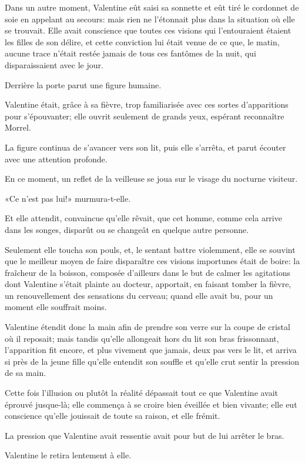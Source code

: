 Dans un autre moment, Valentine eût saisi sa sonnette et eût tiré le cordonnet de soie en appelant au secours: mais rien ne l'étonnait plus dans la situation où elle se trouvait. Elle avait conscience que toutes ces visions qui l'entouraient étaient les filles de son délire, et cette conviction lui était venue de ce que, le matin, aucune trace n'était restée jamais de tous ces fantômes de la nuit, qui disparaissaient avec le jour. 

Derrière la porte parut une figure humaine. 

Valentine était, grâce à sa fièvre, trop familiarisée avec ces sortes d'apparitions pour s'épouvanter; elle ouvrit seulement de grands yeux, espérant reconnaître Morrel. 

La figure continua de s'avancer vers son lit, puis elle s'arrêta, et parut écouter avec une attention profonde. 

En ce moment, un reflet de la veilleuse se joua sur le visage du nocturne visiteur. 

«Ce n'est pas lui!» murmura-t-elle. 

Et elle attendit, convaincue qu'elle rêvait, que cet homme, comme cela arrive dans les songes, disparût ou se changeât en quelque autre personne. 

Seulement elle toucha son pouls, et, le sentant battre violemment, elle se souvint que le meilleur moyen de faire disparaître ces visions importunes était de boire: la fraîcheur de la boisson, composée d'ailleurs dans le but de calmer les agitations dont Valentine s'était plainte au docteur, apportait, en faisant tomber la fièvre, un renouvellement des sensations du cerveau; quand elle avait bu, pour un moment elle souffrait moins. 

Valentine étendit donc la main afin de prendre son verre sur la coupe de cristal où il reposait; mais tandis qu'elle allongeait hors du lit son bras frissonnant, l'apparition fit encore, et plus vivement que jamais, deux pas vers le lit, et arriva si près de la jeune fille qu'elle entendit son souffle et qu'elle crut sentir la pression de sa main. 

Cette fois l'illusion ou plutôt la réalité dépassait tout ce que Valentine avait éprouvé jusque-là; elle commença à se croire bien éveillée et bien vivante; elle eut conscience qu'elle jouissait de toute sa raison, et elle frémit. 

La pression que Valentine avait ressentie avait pour but de lui arrêter le bras. 

Valentine le retira lentement à elle. 

